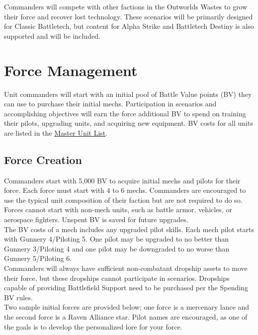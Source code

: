 \documentclass[UTF8]{article}
\begin{document}
Commanders will compete with other factions in the Outworlds Wastes to grow their force and recover lost technology.
These scenarios will be primarily designed for Classic Battletech, but content for Alpha Strike and Battletech Destiny is also supported and will be included.\\

\newpage

\section{Force Management}

Unit commanders will start with an initial pool of Battle Value points (BV) they can use to purchase their initial mechs.
Participation in scenarios and accomplishing objectives will earn the force additional BV to spend on training their pilots, upgrading units, and acquiring new equipment.
BV costs for all units are listed in the \href{http://www.masterunitlist.info/}{Master Unit List}.\\

\subsection{Force Creation}

Commanders start with 5,000 BV to acquire initial mechs and pilots for their force.
Each force must start with 4 to 6 mechs.
Commanders are encouraged to use the typical unit composition of their faction but are not required to do so.
Forces cannot start with non-mech units, such as battle armor, vehicles, or aerospace fighters.
Unspent BV is saved for future upgrades.\\

The BV costs of a mech includes any upgraded pilot skills.
Each mech pilot starts with Gunnery 4/Piloting 5.
One pilot may be upgraded to no better than Gunnery 3/Piloting 4 and one pilot may be downgraded to no worse than Gunnery 5/Piloting 6.\\

Commanders will always have sufficient non-combatant dropship assets to move their force, but these dropships cannot participate in scenarios.
Dropships capable of providing Battlefield Support need to be purchased per the Spending BV rules.\\

Two sample initial forces are provided below; one force is a mercenary lance and the second force is a Raven Alliance star.
Pilot names are encouraged, as one of the goals is to develop the personalized lore for your force.\\
\end{document}
